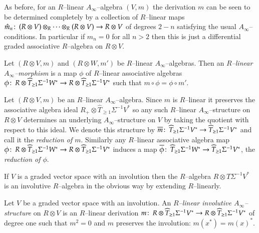\documentclass[british]{amsart}
\theoremstyle{plain}
\theoremstyle{definition}
{
\newaliascnt{{definition}}{theorem}\newtheorem{{definition}}[{definition}]{{Definition}}\aliascntresetthe{{definition}}\expandafterautorefname\endcsname{{Definition}}}
{
\newaliascnt{{remark}}{theorem}\newtheorem{{remark}}[{remark}]{{Remark}}\aliascntresetthe{{remark}}\expandafterautorefname\endcsname{{Remark}}}
{
\newaliascnt{{example}}{theorem}\newtheorem{{example}}[{example}]{{Example}}\aliascntresetthe{{example}}\expandafterautorefname\endcsname{{Example}}}
{
\newaliascnt{{examples}}{theorem}\newtheorem{{examples}}[{examples}]{{Examples}}\aliascntresetthe{{examples}}\expandafterautorefname\endcsname{{Examples}}}
{
\newaliascnt{{notation}}{theorem}\newtheorem{{notation}}[{notation}]{{Notation}}\aliascntresetthe{{notation}}\expandafterautorefname\endcsname{{Notation}}}
{
\newaliascnt{{convention}}{theorem}\newtheorem{{convention}}[{convention}]{{Convention}}\aliascntresetthe{{convention}}\expandafterautorefname\endcsname{{Convention}}}
\numberwithin{equation}{section}
\numberwithin{figure}{section}
\begin{document}
As before, for an $R$--linear $A_\infty$--algebra $(V,m)$ the derivation $m$ can be seen to be determined completely by a collection of $R$--linear maps $\hat{m}_n{\colon\thinspace} (R\otimes V)\otimes_R  \dots \otimes_R (R\otimes V) \rightarrow R\otimes V$ of degrees $2-n$ satisfying the usual $A_\infty$--conditions. In particular if $\hat{m}_n = 0$ for all $n > 2$ then this is just a differential graded associative $R$--algebra on $R\otimes V$.

\begin{definition}
Let $(R\otimes V,m)$ and $(R\otimes W, m')$ be $R$--linear $A_\infty$--algebras. Then an \emph{$R$--linear $A_\infty$--morphism} is a map $\phi$ of $R$--linear associative algebras $\phi{\colon\thinspace} R\otimes \widehat{T}_{\geq 1}\Sigma^{-1}W^*\rightarrow R \otimes \widehat{T}_{\geq 1}\Sigma^{-1}V^*$ such that $m\circ \phi = \phi \circ m'$.
\end{definition}

Let $(R\otimes V,m)$ be an $R$--linear $A_\infty$--algebra. Since $m$ is $R$--linear it preserves the associative algebra ideal $R_+\otimes \widehat{T}_{\geq 1} \Sigma^{-1}V^*$ so any such $R$--linear $A_\infty$--structure on $R\otimes V$ determines an underlying $A_\infty$--structure on $V$ by taking the quotient with respect to this ideal. We denote this structure by ${\overline{{m}}}{\colon\thinspace}\widehat{T}_{\geq 1}\Sigma^{-1}V^*\rightarrow \widehat{T}_{\geq 1}\Sigma^{-1}V^*$ and call it the \emph{reduction of $m$}. Similarly any $R$--linear associative algebra map $\phi{\colon\thinspace} R\otimes \widehat{T}_{\geq 1}\Sigma^{-1}W^*\rightarrow R \otimes \widehat{T}_{\geq 1}\Sigma^{-1}V^*$ induces a map ${\overline{{\phi}}}{\colon\thinspace} \widehat{T}_{\geq 1}\Sigma^{-1}W^*\rightarrow \widehat{T}_{\geq 1}\Sigma^{-1}V^*$, the \emph{reduction of $\phi$}. 

If $V$ is a graded vector space with an involution then the $R$--algebra $R\otimes \widehat{T}\Sigma^{-1}V^*$ is an involutive $R$--algebra in the obvious way by extending $R$--linearly.

\begin{definition}
Let $V$ be a graded vector space with an involution. An \emph{$R$--linear involutive $A_\infty$--structure} on $R\otimes V$ is an $R$--linear derivation $m{\colon\thinspace} R \otimes \widehat{T}_{\geq 1}\Sigma^{-1}V^*\rightarrow R \otimes \widehat{T}_{\geq 1}\Sigma^{-1}V^*$ of degree one such that $m^2=0$ and $m$ preserves the involution: $m(x^*)=m(x)^*$.
\end{definition}
\end{document}
